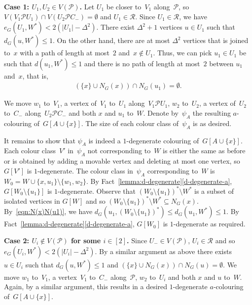 \documentclass[10pt,a4paper]{amsart}
\begin{document}
\begin{proofclaim}
\noindent\textbf{Case 1: $U_1, U_2 \in V(\mathcal{P})$.}
Let $U_1$ be closer to~$V_1$ along~$\mathcal{P}$, so $V(V_1\mathcal{P}U_1) \cap V(U_2 \mathcal{P}C_-) = \emptyset$ and $U_1 \in \mathcal{R}$.
Since  $U_1 \in \mathcal{R}$, we have $e_G(U_1, W^*) < 2 (|U_1| -  \Delta^2)$.
There exist $\Delta^2+1$ vertices $u \in U_1$ such that $d_G(u, W^*) \le 1 $.
On the other hand,  there are at most $\Delta^2$ vertices that is joined to~$x$ with a path of length at most~$2$ and~$x \notin U_1$.
Thus, we can pick $u_1 \in U_1$ be such that $d(u_1, W^*) \le 1 $ and there is no path of length at most~$2$ between $u_1$ and~$x$, that is,
\begin{align}
	(\{x\} \cup N_G(x) ) \cap N_G(u_1) = \emptyset. \label{eqn:N(x)N(u1)}
\end{align}

We move $w_1$ to~$V_1$, a vertex of~$V_1$ to~$U_1$ along~$V_1\mathcal{P}U_1$, $w_2$ to~$U_2$, a vertex of~$U_2$ to~$C_-$ along~$U_2 \mathcal{P}C_-$ and both $x$ and $u_1$ to~$W$. Denote by~$\psi_A$ the resulting $a$-colouring of~$G[A \cup \{x\}]$.
The size of each colour class of~$\psi_A$ is as desired.

It remains to show that $\psi_A$ is indeed a $1$-degenerate colouring of~$G[A \cup \{x\}]$.
Each colour class~$V'$ in~$\psi_A$ not corresponding to~$W$ is either the same as before or is obtained by adding a movable vertex and deleting at most one vertex, so $G[V']$ is $1$-degenerate.
The colour class in~$\psi_A$ corresponding to~$W$ is $W_0 = W \cup \{x,u_1\} \setminus \{w_1,w_2\}$.
By Fact~\ref{lemma:d-degenerate}\ref{d-degenerate-a}, $G[W_0 \setminus \{u_1\}]$ is $1$-degenerate.
Observe that $(W_0 \setminus \{u_1\})^* \setminus W^*$ is a subset of isolated vertices in $G[W]$ and so $(W_0 \setminus \{u_1\})^* \setminus W^* \subseteq N_G(x)$.
By~\eqref{eqn:N(x)N(u1)}, we have $d_G(u_1, (W_0 \setminus \{u_1\})^*) \le d_G(u_1, W^*) \le 1$.
By Fact~\ref{lemma:d-degenerate}\ref{d-degenerate-a}, $G[W_0 ]$ is $1$-degenerate as required.


\noindent\textbf{Case 2: $U_i \notin V(\mathcal{P})$ for some $i \in [2]$.}
Since $U_- \in V(\mathcal{P})$, $U_i \in \mathcal{R}$ and so $e_G(U_i, W^*) < 2 (|U_i| -  \Delta^2)$.
By a similar argument as above there exists $u \in U_i$ such that $d_G(u, W^*) \le 1 $ and $(\{x\} \cup	N_G(x)) \cap N_G(u) = \emptyset$.
We move $w_1$ to~$V_1$, a vertex~$V_1$ to~$C_-$ along~$\mathcal{P}$, $w_2$ to~$U_i$ and both $x$ and $u$ to~$W$.
Again, by a similar argument, this results in a desired $1$-degenerate $a$-colouring of~$G[A \cup \{x\}]$.
\end{proofclaim}
\end{document}
